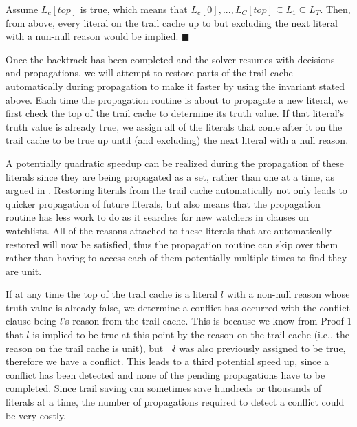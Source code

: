\documentclass{article}
\begin{document}
Assume $L_c[top]$ is true, which means that $L_c[0], ..., L_C[top] \subseteq L_1 \subseteq L_T$. Then, from above, every literal on the trail cache up to but excluding the next literal with a nun-null reason would be implied. $\blacksquare$\newline

Once the backtrack has been completed and the solver resumes with decisions and propagations, we will attempt to restore parts of the trail cache automatically during propagation to make it faster by using the invariant stated above. Each time the propagation routine is about to propagate a new literal, we first check the top of the trail cache to determine its truth value. If that literal's truth value is already true, we assign all of the literals that come after it on the trail cache to be true up until (and excluding) the next literal with a null reason. 

A potentially quadratic speedup can be realized during the propagation of these literals since they are being propagated as a set, rather than one at a time, as argued in \cite{DBLP:conf/sat/HickeyB19, DBLP:journals/jair/Gent13}. Restoring literals from the trail cache automatically not only leads to quicker propagation of future literals, but also means that the propagation routine has less work to do as it searches for new watchers in clauses on watchlists. All of the reasons attached to these literals that are automatically restored will now be satisfied, thus the propagation routine can skip over them rather than having to access each of them potentially multiple times to find they are unit.

If at any time the top of the trail cache is a literal $l$ with a non-null reason whose truth value is already false, we determine a conflict has occurred with the conflict clause being $l$'s reason from the trail cache. This is because we know from Proof 1 that $l$ is implied to be true at this point by the reason on the trail cache (i.e., the reason on the trail cache is unit), but $\lnot l$ was also previously assigned to be true, therefore we have a conflict. This leads to a third potential speed up, since a conflict has been detected and none of the pending propagations have to be completed. Since trail saving can sometimes save hundreds or thousands of literals at a time, the number of propagations required to detect a conflict could be very costly.
\end{document}
